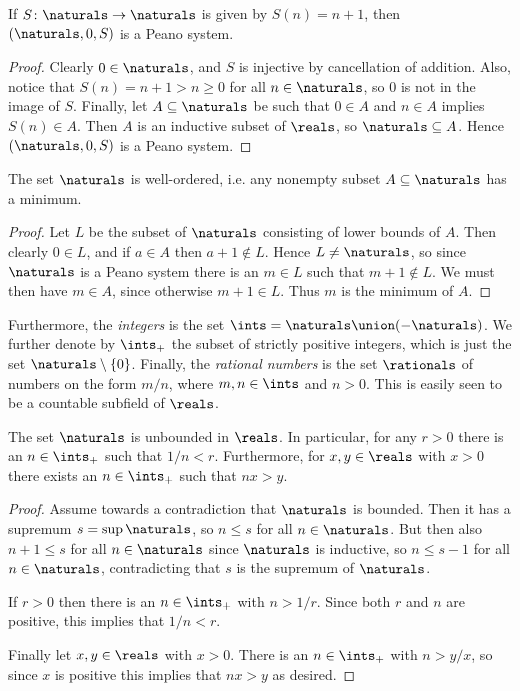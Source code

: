 \documentclass[article, a4paper, 11pt, oneside]{memoir}
\numberwithin{equation}{chapter}
\newcommand{\posints}{\ints_{+}}
\begin{document}
\begin{proposition}
    If $S \colon \naturals \to \naturals$ is given by $S(n) = n+1$, then $(\naturals,0,S)$ is a Peano system.
\end{proposition}

\begin{proof}
    Clearly $0 \in \naturals$, and $S$ is injective by cancellation of addition. Also, notice that $S(n) = n+1 > n \geq 0$ for all $n \in \naturals$, so $0$ is not in the image of $S$. Finally, let $A \subseteq \naturals$ be such that $0 \in A$ and $n \in A$ implies $S(n) \in A$. Then $A$ is an inductive subset of $\reals$, so $\naturals \subseteq A$. Hence $(\naturals,0,S)$ is a Peano system.
\end{proof}


\begin{corollary}
    The set $\naturals$ is well-ordered, i.e. any nonempty subset $A \subseteq \naturals$ has a minimum.
\end{corollary}

\begin{proof}
    Let $L$ be the subset of $\naturals$ consisting of lower bounds of $A$. Then clearly $0 \in L$, and if $a \in A$ then $a+1 \not\in L$. Hence $L \neq \naturals$, so since $\naturals$ is a Peano system there is an $m \in L$ such that $m+1 \not\in L$. We must then have $m \in A$, since otherwise $m+1 \in L$. Thus $m$ is the minimum of $A$.
\end{proof}

Furthermore, the \emph{integers} is the set $\ints = \naturals \union (-\naturals)$. We further denote by $\posints$ the subset of strictly positive integers, which is just the set $\naturals \setminus \{0\}$. Finally, the \emph{rational numbers} is the set $\rationals$ of numbers on the form $m/n$, where $m,n \in \ints$ and $n > 0$. This is easily seen to be a countable subfield of $\reals$.


\begin{proposition}
    The set $\naturals$ is unbounded in $\reals$. In particular, for any $r > 0$ there is an $n \in \posints$ such that $1/n < r$. Furthermore, for $x,y \in \reals$ with $x > 0$ there exists an $n \in \posints$ such that $nx > y$.
\end{proposition}

\begin{proof}
    Assume towards a contradiction that $\naturals$ is bounded. Then it has a supremum $s = \sup \naturals$, so $n \leq s$ for all $n \in \naturals$. But then also $n+1 \leq s$ for all $n \in \naturals$ since $\naturals$ is inductive, so $n \leq s-1$ for all $n \in \naturals$, contradicting that $s$ is the supremum of $\naturals$.

    If $r > 0$ then there is an $n \in \posints$ with $n > 1/r$. Since both $r$ and $n$ are positive, this implies that $1/n < r$.

    Finally let $x,y \in \reals$ with $x > 0$. There is an $n \in \posints$ with $n > y/x$, so since $x$ is positive this implies that $nx > y$ as desired.
\end{proof}
\end{document}
